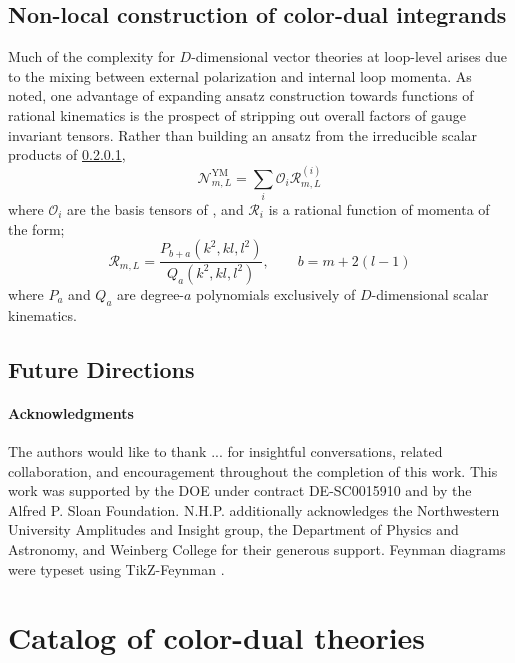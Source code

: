 \documentclass[11pt,letter]{article}
\begin{document}
\subsection{Non-local construction of color-dual integrands}\label{nonLocalLoops}
Much of the complexity for $D$-dimensional vector theories at loop-level arises due to the mixing between external polarization and internal loop momenta. As noted, one advantage of expanding ansatz construction towards functions of rational kinematics is the prospect of stripping out overall factors of gauge invariant tensors. Rather than building an ansatz from the irreducible scalar products of \ref{}, 
\begin{equation}
\mathcal{N}^{\text{YM}}_{m,L} = \sum_i \mathcal{O}_i \mathcal{R}^{(i)}_{m,L}
\end{equation}
where $\mathcal{O}_i$ are the basis tensors of \cite{Bern:2017tuc,Carrasco:2019yyn}, and $ \mathcal{R}_i$ is a rational function of momenta of the form;
\begin{equation}
\mathcal{R}_{m,L} = \frac{P_{b+a}(k^2,kl,l^2)}{Q_a(k^2,kl,l^2)}, \qquad b=m+2(l-1)
\end{equation}
where $P_{a}$ and $Q_a$ are degree-$a$ polynomials exclusively of $D$-dimensional scalar kinematics. 
\subsection{Future Directions}\label{sec:Discussion}
\paragraph{Acknowledgments} The authors would like to thank ... for insightful conversations, related collaboration, and encouragement throughout the completion of this work. This work was supported by the DOE under contract DE-SC0015910 and by the Alfred P. Sloan Foundation. N.H.P. additionally acknowledges the Northwestern University Amplitudes and Insight group, the Department of Physics and Astronomy, and Weinberg College for their generous support.
Feynman diagrams were typeset using TikZ-Feynman \cite{Ellis:2016jkw}.

\appendix
\section{Catalog of color-dual theories}
\label{sec:CKLagrangians}
\end{document}
